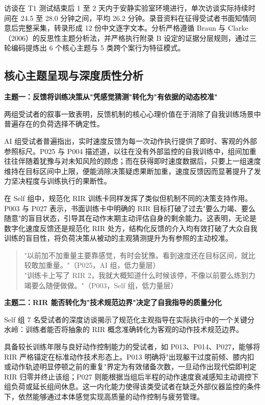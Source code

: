 \documentclass[UTF8,zihao=-4,twoside,openany]{ctexbook}
\begin{document}
访谈在 T1 测试结束后 1 至 2 天内于安静实验室环境进行，单次访谈实际持续时间在 24.5 至 28.0 分钟之间，平均 26.2 分钟。录音资料在征得受试者书面知情同意后完整采集，转录形成 12 份中文逐字文本。分析严格遵循 Braun 与 Clarke（2006）的反思性主题分析法，并严格执行附录 B 设定的证据分层规则，通过三轮编码提炼出 6 个核心主题与 5 类跨个案行为特征模式。

\subsection{核心主题呈现与深度质性分析}

\noindent \textbf{主题一：反馈将训练决策从"凭感觉猜测"转化为"有依据的动态校准"}

两组受试者的叙事一致表明，反馈机制的核心心理价值在于消除了自我训练场景中普遍存在的负荷选择不确定性。

AI 组受试者普遍指出，实时速度反馈为每一次动作执行提供了即时、客观的外部参照标尺。P025 与 P004 描述道，以往在没有外部监控的自我训练中，组间加重往往伴随着犹豫与对未知风险的顾虑；而在获得即时速度数据后，只要上一组速度维持在目标区间中上限，便能消除决策疑虑果断加重，速度反馈因而显著提升了发力坚决程度与训练执行的果断性。

在 Self 组中，规范化 RIR 训练卡同样发挥了类似但机制不同的决策支持作用。P003 与 P027 表示，书面训练卡中明确的 RIR 目标打破了过去"要么力竭、要么随意"的盲目状态，引导其在动作末期主动评估自身的剩余能力。这表明，无论是数字化速度反馈还是规范化 RIR 处方，结构化反馈的介入均有效打破了大众自我训练的盲目性，将负荷决策从被动的主观猜测提升为有参照的主动校准。

\begin{quote}
  \kaishu\fontsize{10.5pt}{16pt}\selectfont
  "以前加不加重量主要靠感觉，有时会犹豫。看到速度还在目标区间，就比较敢加重量。"（P025，AI 组，低力量层） \\[0.2cm]
  "训练卡上写了 RIR 2，我就大概知道什么时候该停，不像以前要么练到力竭要么随便做做。"（P003，Self 组，低力量层）
\end{quote}

\vspace{0.3cm}
\noindent \textbf{主题二：RIR 能否转化为"技术规范边界"决定了自我指导的质量分化}

Self 组 7 名受试者的深度访谈揭示了规范化主观指导在实际执行中的一个关键分水岭：训练者能否将抽象的 RIR 概念准确转化为客观的动作技术规范边界。

具备较长训练年限与良好动作控制能力的受试者，如 P013、P014、P027，能够将 RIR 严格锚定在标准动作技术形态上。P013 明确将"出现躯干过度前倾、膝内扣或动作轨迹明显停顿之前的重复"界定为有效储备次数，一旦动作出现代偿即判定 RIR 归零并终止该组；P027 则能根据当组后半程的动作速度衰减感知主动调控下组负荷或延长组间休息。这一内化能力使得该类受试者在缺乏外部仪器监控的条件下，依然能够通过本体感觉实现高质量的动作控制与疲劳管理。
\end{document}
